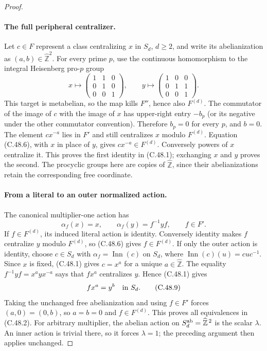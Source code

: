 \begin{proof}
\paragraph{The full peripheral centralizer.}
Let $c\in F$ represent a class centralizing $x$ in $S_d$, $d\geq2$,
and write its abelianization as $(a,b)\in\widehat{\mathbb Z}^2$.
For every prime $p$, use the continuous homomorphism to the integral
Heisenberg pro-$p$ group
\[
 x\longmapsto
 \begin{pmatrix}1&1&0\\0&1&0\\0&0&1\end{pmatrix},\qquad
 y\longmapsto
 \begin{pmatrix}1&0&0\\0&1&1\\0&0&1\end{pmatrix}.       \tag{C.48.7}
\]
This target is metabelian, so the map kills $F''$, hence also
$F^{(d)}$. The commutator of the image of $c$ with the image of
$x$ has upper-right entry $-b_p$ (or its negative under the other
commutator convention). Therefore $b_p=0$ for every $p$, and $b=0$.
The element $c x^{-a}$ lies in $F'$ and still centralizes $x$
modulo $F^{(d)}$. Equation (C.48.6), with $x$ in place of $y$,
gives $c x^{-a}\in F^{(d)}$.
Conversely powers of $x$ centralize it. This proves the first
identity in (C.48.1); exchanging $x$ and $y$ proves the second.
The procyclic groups here are copies of $\widehat{\mathbb Z}$,
since their abelianizations retain the corresponding free coordinate.

\paragraph{From a literal to an outer normalized action.}
The canonical multiplier-one action has
\[
              \alpha_f(x)=x,\qquad
              \alpha_f(y)=f^{-1}yf,
              \qquad f\in F'.                         \tag{C.48.8}
\]
If $f\in F^{(d)}$, its induced literal action is identity.
Conversely identity makes $f$ centralize $y$ modulo $F^{(d)}$,
so (C.48.6) gives $f\in F^{(d)}$.
If only the outer action is identity, choose $c\in S_d$ with
$\alpha_f=\operatorname{Inn}(c)$ on $S_d$, where
$\operatorname{Inn}(c)(u)=cuc^{-1}$.
Since $x$ is fixed, (C.48.1) gives $c=x^a$ for a unique
$a\in\widehat{\mathbb Z}$.
The equality $f^{-1}yf=x^a yx^{-a}$ says that $f x^a$
centralizes $y$. Hence (C.48.1) gives
\[
                        f x^a=y^b\quad\hbox{in }S_d.  \tag{C.48.9}
\]
Taking the unchanged free abelianization and using $f\in F'$
forces $(a,0)=(0,b)$, so $a=b=0$ and $f\in F^{(d)}$.
This proves all equivalences in (C.48.2). For arbitrary multiplier,
the abelian action on $S_d^{\rm ab}=\widehat{\mathbb Z}^{\,2}$
is the scalar $\lambda$. An inner action is trivial there, so it
forces $\lambda=1$; the preceding argument then applies unchanged.


\end{proof}

